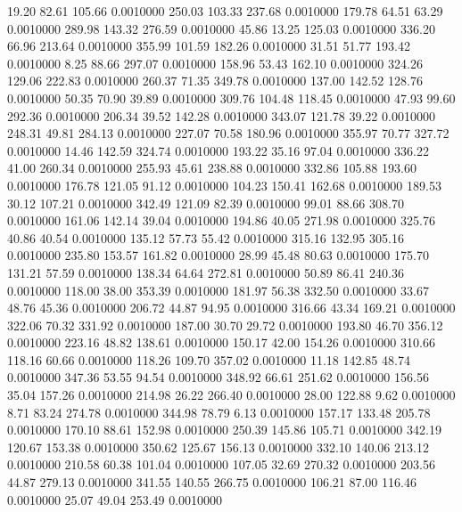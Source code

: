   19.20   82.61  105.66   0.0010000
 250.03  103.33  237.68   0.0010000
 179.78   64.51   63.29   0.0010000
 289.98  143.32  276.59   0.0010000
  45.86   13.25  125.03   0.0010000
 336.20   66.96  213.64   0.0010000
 355.99  101.59  182.26   0.0010000
  31.51   51.77  193.42   0.0010000
   8.25   88.66  297.07   0.0010000
 158.96   53.43  162.10   0.0010000
 324.26  129.06  222.83   0.0010000
 260.37   71.35  349.78   0.0010000
 137.00  142.52  128.76   0.0010000
  50.35   70.90   39.89   0.0010000
 309.76  104.48  118.45   0.0010000
  47.93   99.60  292.36   0.0010000
 206.34   39.52  142.28   0.0010000
 343.07  121.78   39.22   0.0010000
 248.31   49.81  284.13   0.0010000
 227.07   70.58  180.96   0.0010000
 355.97   70.77  327.72   0.0010000
  14.46  142.59  324.74   0.0010000
 193.22   35.16   97.04   0.0010000
 336.22   41.00  260.34   0.0010000
 255.93   45.61  238.88   0.0010000
 332.86  105.88  193.60   0.0010000
 176.78  121.05   91.12   0.0010000
 104.23  150.41  162.68   0.0010000
 189.53   30.12  107.21   0.0010000
 342.49  121.09   82.39   0.0010000
  99.01   88.66  308.70   0.0010000
 161.06  142.14   39.04   0.0010000
 194.86   40.05  271.98   0.0010000
 325.76   40.86   40.54   0.0010000
 135.12   57.73   55.42   0.0010000
 315.16  132.95  305.16   0.0010000
 235.80  153.57  161.82   0.0010000
  28.99   45.48   80.63   0.0010000
 175.70  131.21   57.59   0.0010000
 138.34   64.64  272.81   0.0010000
  50.89   86.41  240.36   0.0010000
 118.00   38.00  353.39   0.0010000
 181.97   56.38  332.50   0.0010000
  33.67   48.76   45.36   0.0010000
 206.72   44.87   94.95   0.0010000
 316.66   43.34  169.21   0.0010000
 322.06   70.32  331.92   0.0010000
 187.00   30.70   29.72   0.0010000
 193.80   46.70  356.12   0.0010000
 223.16   48.82  138.61   0.0010000
 150.17   42.00  154.26   0.0010000
 310.66  118.16   60.66   0.0010000
 118.26  109.70  357.02   0.0010000
  11.18  142.85   48.74   0.0010000
 347.36   53.55   94.54   0.0010000
 348.92   66.61  251.62   0.0010000
 156.56   35.04  157.26   0.0010000
 214.98   26.22  266.40   0.0010000
  28.00  122.88    9.62   0.0010000
   8.71   83.24  274.78   0.0010000
 344.98   78.79    6.13   0.0010000
 157.17  133.48  205.78   0.0010000
 170.10   88.61  152.98   0.0010000
 250.39  145.86  105.71   0.0010000
 342.19  120.67  153.38   0.0010000
 350.62  125.67  156.13   0.0010000
 332.10  140.06  213.12   0.0010000
 210.58   60.38  101.04   0.0010000
 107.05   32.69  270.32   0.0010000
 203.56   44.87  279.13   0.0010000
 341.55  140.55  266.75   0.0010000
 106.21   87.00  116.46   0.0010000
  25.07   49.04  253.49   0.0010000
